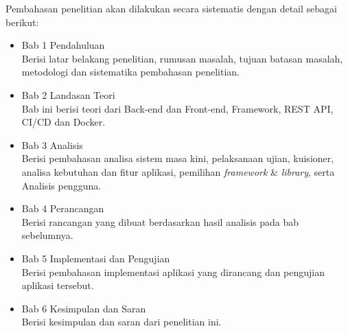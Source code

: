 Pembahasan penelitian akan dilakukan secara sistematis dengan detail sebagai
berikut:

\begin{itemize}
    \item Bab 1 Pendahuluan \\
        Berisi latar belakang penelitian, rumusan masalah, tujuan batasan
        masalah, metodologi dan sistematika pembahasan penelitian.
    
    \item Bab 2 Landasan Teori \\
        Bab ini berisi teori dari Back-end dan Front-end, Framework, REST API,
        CI/CD dan Docker.
        
    \item Bab 3 Analisis \\
        Berisi pembahasan analisa sistem masa kini, pelaksanaan ujian,
        kuisioner, analisa kebutuhan dan fitur aplikasi, pemilihan
        \textit{framework} & \textit{library}, serta Analisis pengguna.
        
        
    \item Bab 4 Perancangan \\
        Berisi rancangan yang dibuat berdasarkan hasil analisis pada bab
        sebelumnya.
    
    \item Bab 5 Implementasi dan Pengujian \\
        Berisi pembahasan implementasi aplikasi yang dirancang dan pengujian
        aplikasi tersebut.
        
    \item Bab 6 Kesimpulan dan Saran \\
        Berisi kesimpulan dan saran dari penelitian ini.
\end{itemize}